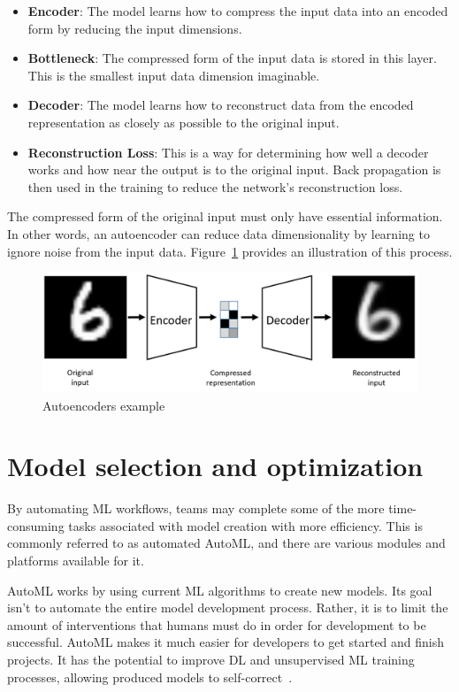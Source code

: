 \begin{itemize}
    \item \textbf{Encoder}: The model learns how to compress the input data into an encoded form by reducing the input dimensions.
    \item \textbf{Bottleneck}: The compressed form of the input data is stored in this layer. This is the smallest input data dimension imaginable.
    \item \textbf{Decoder}: The model learns how to reconstruct data from the encoded representation as closely as possible to the original input.
    \item \textbf{Reconstruction Loss}: This is a way for determining how well a decoder works and how near the output is to the original input. Back propagation is then used in the training to reduce the network's reconstruction loss.
\end{itemize}

The compressed form of the original input must only have essential information. In other words, an autoencoder can reduce data dimensionality by learning to ignore noise from the input data. Figure~\ref{fig:ac_example} provides an illustration of this process.

\begin{figure}[htbp]
    \centering
    \includegraphics[width=0.7\linewidth]{Chapters/Figures/ac_example.png}
    \caption{Autoencoders example~\cite{LopezPinaya2020Autoencoders}}
    \label{fig:ac_example}
\end{figure}

\section{Model selection and optimization}

By automating \gls{ML} workflows, teams may complete some of the more time-consuming tasks associated with model creation with more efficiency. This is commonly referred to as automated \gls{AutoML}, and there are various modules and platforms available for it.

\gls{AutoML} works by using current \gls{ML} algorithms to create new models. Its goal isn't to automate the entire model development process. Rather, it is to limit the amount of interventions that humans must do in order for development to be successful. \gls{AutoML} makes it much easier for developers to get started and finish projects. It has the potential to improve \gls{DL} and unsupervised \gls{ML} training processes, allowing produced models to self-correct~\cite{MachineRun:AI}.

